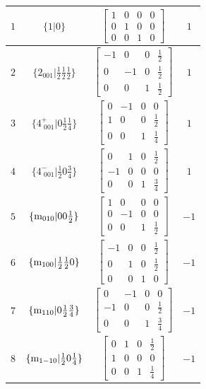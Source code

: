 \documentclass[fleqn,8pt]{jsarticle}
\begin{document}
\begin{longtable}{cccc}
$ 1 $ & $ \{1|0\} $ & $ \begin{bmatrix} 1 & 0 & 0 & 0 \\ 0 & 1 & 0 & 0 \\ 0 & 0 & 1 & 0 \end{bmatrix} $ & $ 1 $ \\ \hline
$ 2 $ & $ \{2{}_{001}|\frac{1}{2} \frac{1}{2} \frac{1}{2}\} $ & $ \begin{bmatrix} -1 & 0 & 0 & \frac{1}{2} \\ 0 & -1 & 0 & \frac{1}{2} \\ 0 & 0 & 1 & \frac{1}{2} \end{bmatrix} $ & $ 1 $ \\ \hline
$ 3 $ & $ \{4^{+}_{\,\,001}|0 \frac{1}{2} \frac{1}{4}\} $ & $ \begin{bmatrix} 0 & -1 & 0 & 0 \\ 1 & 0 & 0 & \frac{1}{2} \\ 0 & 0 & 1 & \frac{1}{4} \end{bmatrix} $ & $ 1 $ \\ \hline
$ 4 $ & $ \{4^{-}_{\,\,001}|\frac{1}{2} 0 \frac{3}{4}\} $ & $ \begin{bmatrix} 0 & 1 & 0 & \frac{1}{2} \\ -1 & 0 & 0 & 0 \\ 0 & 0 & 1 & \frac{3}{4} \end{bmatrix} $ & $ 1 $ \\ \hline
$ 5 $ & $ \{{\rm m}_{010}|0 0 \frac{1}{2}\} $ & $ \begin{bmatrix} 1 & 0 & 0 & 0 \\ 0 & -1 & 0 & 0 \\ 0 & 0 & 1 & \frac{1}{2} \end{bmatrix} $ & $ -1 $ \\ \hline
$ 6 $ & $ \{{\rm m}_{100}|\frac{1}{2} \frac{1}{2} 0\} $ & $ \begin{bmatrix} -1 & 0 & 0 & \frac{1}{2} \\ 0 & 1 & 0 & \frac{1}{2} \\ 0 & 0 & 1 & 0 \end{bmatrix} $ & $ -1 $ \\ \hline
$ 7 $ & $ \{{\rm m}_{110}|0 \frac{1}{2} \frac{3}{4}\} $ & $ \begin{bmatrix} 0 & -1 & 0 & 0 \\ -1 & 0 & 0 & \frac{1}{2} \\ 0 & 0 & 1 & \frac{3}{4} \end{bmatrix} $ & $ -1 $ \\ \hline
$ 8 $ & $ \{{\rm m}_{1-10}|\frac{1}{2} 0 \frac{1}{4}\} $ & $ \begin{bmatrix} 0 & 1 & 0 & \frac{1}{2} \\ 1 & 0 & 0 & 0 \\ 0 & 0 & 1 & \frac{1}{4} \end{bmatrix} $ & $ -1 $ \\
\end{longtable}
\end{document}
